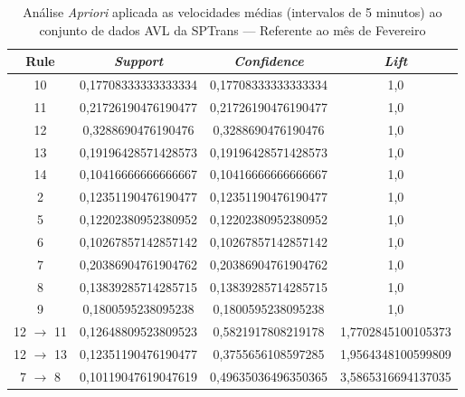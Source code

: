 \documentclass[
	12pt,				%
	oneside,			%
	a4paper,			%
	english,			%
	brazil				%
	]{abntex2ppgsi}
\begin{document}
{{\begin{apendicesenv}
\begin{table}[!htb]
\centering
\caption {Análise \textit{Apriori} aplicada as velocidades médias (intervalos de 5 minutos) ao conjunto de dados AVL da SPTrans --- Referente ao mês de Fevereiro}
\label {tab:aprioriFebruary}
\begin{tabular}{c|c|c|c}
\hline
\textbf{Rule} & \textit{\textbf{Support}} & \textit{\textbf{Confidence}} & \textit{\textbf{Lift}} \\
\hline
10 &  0,17708333333333334 &  0,17708333333333334 &  1,0\\ \hline 11 &  0,21726190476190477 &  0,21726190476190477 &  1,0\\ \hline 12 &  0,3288690476190476 &  0,3288690476190476 &  1,0\\ \hline 13 &  0,19196428571428573 &  0,19196428571428573 &  1,0\\ \hline 14 &  0,10416666666666667 &  0,10416666666666667 &  1,0\\ \hline 2 &  0,12351190476190477 &  0,12351190476190477 &  1,0\\ \hline 5 &  0,12202380952380952 &  0,12202380952380952 &  1,0\\ \hline 6 &  0,10267857142857142 &  0,10267857142857142 &  1,0\\ \hline 7 &  0,20386904761904762 &  0,20386904761904762 &  1,0\\ \hline 8 &  0,13839285714285715 &  0,13839285714285715 &  1,0\\ \hline 9 &  0,1800595238095238 &  0,1800595238095238 &  1,0\\ \hline 12 $\rightarrow$ 11 &  0,12648809523809523 &  0,5821917808219178 &  1,7702845100105373\\ \hline 12 $\rightarrow$ 13 &  0,12351190476190477 &  0,3755656108597285 &  1,9564348100599809\\ \hline 7 $\rightarrow$ 8 &  0,10119047619047619 &  0,49635036496350365 &  3,5865316694137035\\
\hline
\end{tabular}
\end{table}


\end{apendicesenv}}}
\end{document}
